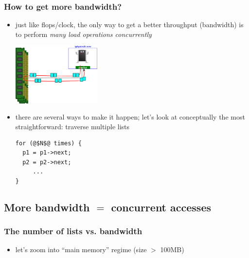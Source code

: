 \documentclass[12pt,dvipdfmx]{beamer}
\newcommand{\ao}[1]{{\color{blue}#1}}
\begin{document}
\begin{frame}[fragile]
\frametitle{How to get more bandwidth?}
\begin{itemize}
\item<1-> 
  just like flops/clock, the only way to get a better throughput (bandwidth) 
  is to perform \ao{\emph{many load operations concurrently}}

\begin{center}
\includegraphics[width=0.35\textwidth]{out/pdf/svg/latency_very_large_2.pdf}
\end{center}

\item<2-> there are several ways to make it happen; 
  let's look at conceptually the most straightforward: traverse multiple lists
\begin{lstlisting}
for (@$N$@ times) {
  p1 = p1->next;
  p2 = p2->next;
     ...
}
\end{lstlisting}
\end{itemize}
\end{frame}

\subsection{More bandwidth $=$ concurrent accesses}

\begin{frame}[fragile]
\frametitle{The number of lists vs. bandwidth}
\begin{center}
  {\scriptsize}
\end{center}
\begin{itemize}

\item let's zoom into ``main memory'' regime (size $>$ 100MB)
\end{itemize}
\end{frame}
\end{document}
